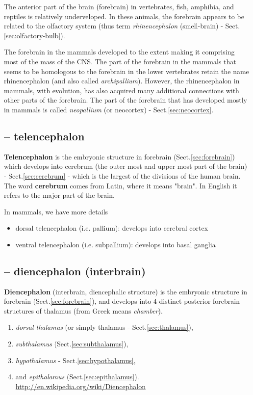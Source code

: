 The anterior part of the brain (forebrain) in vertebrates, fish, amphibia, and
reptiles is relatively underveloped. In these animals, the forebrain appears to
be related to the olfactory system (thus term {\it rhinencephalon}
(smell-brain) - Sect.\ref{sec:olfactory-bulb}).

The forebrain in the mammals developed to the extent making it comprising most
of the mass of the CNS. The part of the forebrain in the mammals that seems to
be homologous to the forebrain in the lower vertebrates retain the name
rhinencephalon (and also called {\it archipallium}). However, the rhinencephalon
in mammals, with evolution, has also acquired many additional connections with
other parts of the forebrain. The part of the forebrain that has developed
mostly in mammals is called {\it neopallium} (or neocortex) -
Sect.\ref{sec:neocortex}.



\subsection{-- telencephalon}
\label{sec:telencephalon}

{\bf Telencephalon} is the embryonic structure in forebrain
(Sect.\ref{sec:forebrain}) which develops into cerebrum (the outer most and
upper most part of the brain) - Sect.\ref{sec:cerebrum} - which is the largest
of the divisions of the human brain. The word {\bf cerebrum} comes from Latin,
where it means "brain".  In English it refers to the major part of the brain.

In mammals, we have more details
\begin{itemize}
  \item dorsal telencephalon (i.e. pallium): develops into cerebral cortex
  
  \item ventral telencephalon (i.e. subpallium): develops into basal ganglia
\end{itemize}


\subsection{--  diencephalon (interbrain)}
\label{sec:diencephalon}  

{\bf Diencephalon} (interbrain, diencephalic structure) is the embryonic
structure in forebrain (Sect.\ref{sec:forebrain}), and develops into 4 distinct
posterior forebrain structures of thalamus (from Greek means {\it chamber}).
\begin{enumerate}
  \item {\it dorsal thalamus} (or simply thalamus -
Sect.\ref{sec:thalamus}), 

  \item {\it subthalamus} (Sect.\ref{sec:subthalamus}), 
  
  \item {\it hypothalamus} - Sect.\ref{sec:hypothalamus}, 

  \item and {\it epithalamus} (Sect.\ref{sec:epithalamus}).
\url{http://en.wikipedia.org/wiki/Diencephalon}
\end{enumerate}


